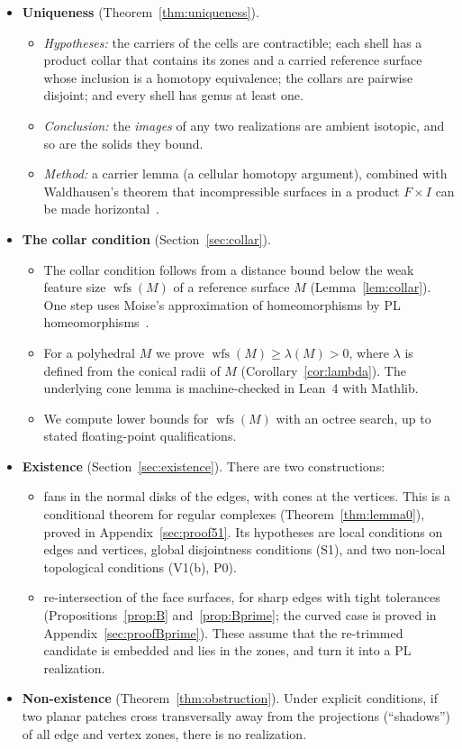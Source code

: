 \documentclass[preprint,12pt]{elsarticle}
\theoremstyle{definition}
\theoremstyle{remark}
\newcommand{\wfs}{\operatorname{wfs}}
\begin{document}
\begin{itemize}
\item \textbf{Uniqueness} (Theorem~\ref{thm:uniqueness}).
  \begin{itemize}
  \item \emph{Hypotheses:} the carriers of the cells are contractible; each shell has a product collar that contains
  its zones and a carried reference surface whose inclusion is a homotopy equivalence; the collars are pairwise
  disjoint; and every shell has genus at least one.
  \item \emph{Conclusion:} the \emph{images} of any two realizations are ambient isotopic, and so are the solids they
  bound.
  \item \emph{Method:} a carrier lemma (a cellular homotopy argument), combined with Waldhausen's theorem that
  incompressible surfaces in a product $F\times I$ can be made horizontal~\cite[Prop.~3.1]{Waldhausen68}.
  \end{itemize}
\item \textbf{The collar condition} (Section~\ref{sec:collar}).
  \begin{itemize}
  \item The collar condition follows from a distance bound below the weak feature size $\wfs(M)$ of a reference
  surface $M$ (Lemma~\ref{lem:collar}). One step uses Moise's approximation of homeomorphisms by PL
  homeomorphisms~\cite[Thm.~35.2]{Moise77}.
  \item For a polyhedral $M$ we prove $\wfs(M)\ge\lambda(M)>0$, where $\lambda$ is defined from the conical radii of
  $M$ (Corollary~\ref{cor:lambda}). The underlying cone lemma is machine-checked in Lean~4 with Mathlib.
  \item We compute lower bounds for $\wfs(M)$ with an octree search, up to stated floating-point qualifications.
  \end{itemize}
\item \textbf{Existence} (Section~\ref{sec:existence}). There are two constructions:
  \begin{itemize}
  \item fans in the normal disks of the edges, with cones at the vertices. This is a conditional theorem for regular
  complexes (Theorem~\ref{thm:lemma0}), proved in Appendix~\ref{sec:proof51}.  Its hypotheses are local conditions on edges and
  vertices, global disjointness conditions (S1), and two non-local topological conditions (V1(b), P0).
  \item re-intersection of the face surfaces, for sharp edges with tight tolerances (Propositions~\ref{prop:B}
  and~\ref{prop:Bprime}; the curved case is proved in Appendix~\ref{sec:proofBprime}). These assume that the re-trimmed
  candidate is embedded and lies in the zones, and turn it into a PL realization.
  \end{itemize}
\item \textbf{Non-existence} (Theorem~\ref{thm:obstruction}). Under explicit conditions, if two planar patches cross
transversally away from the projections (``shadows'') of all edge and vertex zones, there is no realization.
\end{itemize}
\end{document}
